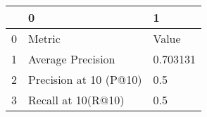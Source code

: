 \begin{tabular}{lll}
\toprule
{} &                       0 &         1 \\
\midrule
0 &                  Metric &     Value \\
1 &       Average Precision &  0.703131 \\
2 &  Precision at 10 (P@10) &       0.5 \\
3 &      Recall at 10(R@10) &       0.5 \\
\bottomrule
\end{tabular}
